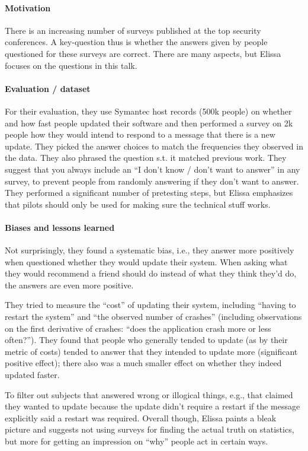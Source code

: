 \documentclass{article}
\begin{document}
\paragraph{Motivation}
There is an increasing number of surveys published at the top security conferences. A key-question thus is whether the answers given by people questioned for these surveys are correct. There are many aspects, but Elissa focuses on the questions in this talk.

\paragraph{Evaluation / dataset}
For their evaluation, they use Symantec host records (500k people) on whether and how fast people updated their software and then performed a survey on 2k people how they would intend to respond to a message that there is a new update.
They picked the answer choices to match the frequencies they observed in the data. They also phrased the question s.t. it matched previous work. They suggest that you always include an ``I don't know / don't want to answer'' in any survey, to prevent people from randomly answering if they don't want to answer.
They performed a significant number of pretesting steps, but Elissa emphasizes that pilots should only be used for making sure the technical stuff works.

\paragraph{Biases and lessons learned} Not surprisingly, they found a systematic bias, i.e., they answer more positively when questioned whether they would update their system. When asking what they would recommend a friend should do instead of what they think they'd do, the answers are even more positive.

They tried to measure the ``cost'' of updating their system, including ``having to restart the system'' and ``the observed number of crashes'' (including observations on the first derivative of crashes: ``does the application crash more or less often?''). They found that people who generally tended to update (as by their metric of costs) tended to answer that they intended to update more (significant positive effect); there also was a much smaller effect on whether they indeed updated faster.

To filter out subjects that answered wrong or illogical things, e.g., that claimed they wanted to update because the update didn't require a restart if the message explicitly said a restart was required. Overall though, Elissa paints a bleak picture and suggests not using surveys for finding the actual truth on statistics, but more for getting an impression on ``why'' people act in certain ways.
\end{document}
